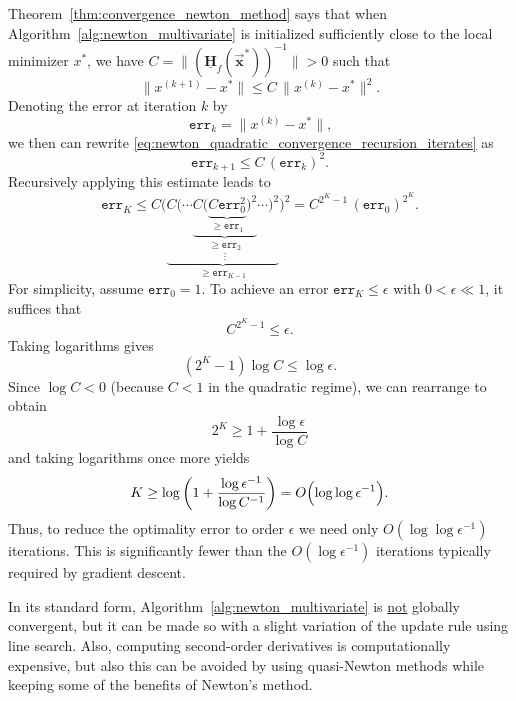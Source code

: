 \documentclass[9pt, headings=standardclasses, parskip=half]{scrartcl}
\renewcommand{\emph}[1]{\textcolor{mypurple}{#1}}
\newcommand{\matr}[1]{\underline{\boldsymbol{#1}}}
\newcommand{\vect}[1]{\vec{\boldsymbol{#1}}}
\begin{document}
Theorem~\ref{thm:convergence_newton_method} says that when Algorithm~\ref{alg:newton_multivariate} is initialized sufficiently close to the local minimizer \(x^{*}\), we have \(C = \|(\matr{H}_{f}(\vect{x}^{*}))^{-1}\| > 0\) such that
\begin{equation}\label{eq:newton_quadratic_convergence_recursion_iterates}
\|x^{(k+1)}-x^{*}\|\le C\,\|x^{(k)}-x^{*}\|^{2} \text{.}
\end{equation}
Denoting the error at iteration \(k\) by
\[
\texttt{err}_{k}=\|x^{(k)}-x^{*}\| \text{,}
\]
we then can rewrite \eqref{eq:newton_quadratic_convergence_recursion_iterates} as
\begin{equation}\label{eq:newton_quadratic_convergence_recursion_error}
\texttt{err}_{k+1}\le C\,(\texttt{err}_{k})^{2} \text{.}
\end{equation}
Recursively applying this estimate leads to
\[
\texttt{err}_{K} \le C \Bigg( 
\underbrace{
C \bigg( 
\underset{\vdots}{
\cdots 
\underbrace{
C \Big( 
\underbrace{
C \texttt{err}_{0}^{2} 
}_{\geq \texttt{err}_{1}}
\Big)^{2} 
}_{\geq \texttt{err}_{2}}
\cdots 
}
\bigg)^{2} 
}_{\geq \texttt{err}_{K-1}}
\Bigg)^{2}
=
C^{2^{K}-1}\,(\texttt{err}_{0})^{2^{K}} \text{.}
\]
For simplicity, assume \(\texttt{err}_{0}=1\). To achieve an error \(\texttt{err}_{K}\le\epsilon\) with \(0<\epsilon\ll 1\), it suffices that
\[
C^{2^{K}-1}\le \epsilon.
\]
Taking logarithms gives
\[
\left(2^{K}-1\right)\log C \le \log \epsilon.
\]
Since \(\log C<0\) (because \(C<1\) in the quadratic regime), we can rearrange to obtain
\[
2^{K}\ge 1+\frac{\log \epsilon}{\log C}
\]
and taking logarithms once more yields
\[
K \ge \log\left(1+\frac{\log \epsilon^{-1}}{\log C^{-1}}\right)=O\Bigl(\log \log \epsilon^{-1}\Bigr).
\]
Thus, to reduce the optimality error to order \(\epsilon\) we need only {\color{red}\(O(\log \log \epsilon^{-1})\)} iterations. 
This is significantly fewer than the \(O(\log \epsilon^{-1})\) iterations typically required by gradient descent.

In its standard form, Algorithm~\ref{alg:newton_multivariate} is \underline{not} globally convergent, but it can be made so with a slight variation of the update rule using \emph{line search}.
Also, computing second-order derivatives is computationally expensive, but also this can be avoided by using \emph{quasi-Newton methods} while keeping some of the benefits of Newton's method.
  
\end{document}
